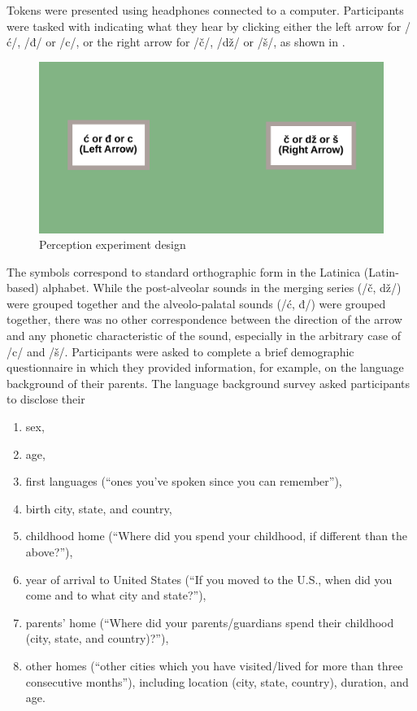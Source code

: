 \documentclass[output=paper,modfonts,newtxmath,hidelinks,]{langscibook}
\begin{document}
Tokens were presented using headphones connected to a computer. Participants were tasked with indicating what they hear by clicking either the left arrow for /ć/, /đ/ or /c/, or the right arrow for /č/, /dž/ or /š/, as shown in .

\begin{figure}[t]
\includegraphics[height=.3\textheight]{figures/MCFigure4.pdf}
\caption{\label{fig:mihajlovic:4} Perception experiment design}
\end{figure}

The symbols correspond to standard orthographic form in the Latinica (Latin-based) alphabet. While the post-alveolar sounds in the merging series (/č, dž/) were grouped together and the alveolo-palatal sounds (/ć, đ/) were grouped together, there was no other correspondence between the direction of the arrow and any phonetic characteristic of the sound, especially in the arbitrary case of /c/ and /š/. Participants were asked to complete a brief demographic questionnaire in which they provided information, for example, on the language background of their parents. The language background survey asked participants to disclose their

\begin{enumerate}
\item sex, 
\item age, 
\item first languages (“ones you’ve spoken since you can remember”), 
\item birth city, state, and country,
\item childhood home (“Where did you spend your childhood, if different than the above?”), 
\item year of arrival to United States (“If you moved to the U.S., when did you come and to what city and state?”), 
\item parents’ home (“Where did your parents/guardians spend their childhood (city, state, and country)?”),
\item other homes (“other cities which you have visited/lived for more than three consecutive months”), including location (city, state, country), duration, and age.
\end{enumerate}
\end{document}
